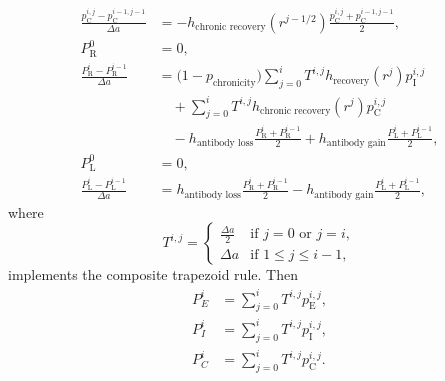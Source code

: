 \documentclass[12pt]{article}
\begin{document}
\begin{equation}
\begin{split}
    \\
    \frac{p_{\mathrm{C}}^{i, j} - p_{\mathrm{C}}^{i - 1, j - 1}}{\Delta a}
    &= - h_{\text{chronic recovery}}(r^{j - 1 / 2})
    \frac{p_{\mathrm{C}}^{i, j} + p_{\mathrm{C}}^{i - 1, j - 1}}{2},
    \\
    P_{\mathrm{R}}^0 &= 0,
    \\
    \frac{P_{\mathrm{R}}^i - P_{\mathrm{R}}^{i - 1}}{\Delta a}
    &= \big(1 - p_{\text{chronicity}}\big)
    \sum_{j = 0}^i T^{i, j} h_{\text{recovery}}(r^j) p_{\mathrm{I}}^{i, j}
    \\ & \quad {}
    + \sum_{j = 0}^i T^{i, j} h_{\text{chronic recovery}}(r^j) p_{\mathrm{C}}^{i, j}
    \\ & \quad {}
    - h_{\text{antibody loss}}
    \frac{P_{\mathrm{R}}^i + P_{\mathrm{R}}^{i - 1}}{2}
    + h_{\text{antibody gain}}
    \frac{P_{\mathrm{L}}^i + P_{\mathrm{L}}^{i - 1}}{2},
    \\
    P_{\mathrm{L}}^0 &= 0,
    \\
    \frac{P_{\mathrm{L}}^i - P_{\mathrm{L}}^{i - 1}}{\Delta a}
    &= h_{\text{antibody loss}}
    \frac{P_{\mathrm{R}}^i + P_{\mathrm{R}}^{i - 1}}{2}
    - h_{\text{antibody gain}}
    \frac{P_{\mathrm{L}}^i + P_{\mathrm{L}}^{i - 1}}{2},
  \end{split}
\end{equation}
where
\begin{equation}
  T^{i, j} =
  \begin{cases}
    \frac{\Delta a}{2} & \text{if $j = 0$ or $j = i$}, \\
    \Delta a & \text{if $1 \leq j \leq i - 1$},
  \end{cases}
\end{equation}
implements the composite trapezoid rule.
Then
\begin{equation}
  \begin{split}
    P_E^i &= \sum_{j = 0}^i T^{i, j} p_{\mathrm{E}}^{i, j},
    \\
    P_I^i &= \sum_{j = 0}^i T^{i, j} p_{\mathrm{I}}^{i, j},
    \\
    P_C^i &= \sum_{j = 0}^i T^{i, j} p_{\mathrm{C}}^{i, j}.
  \end{split}
\end{equation}
\end{document}
